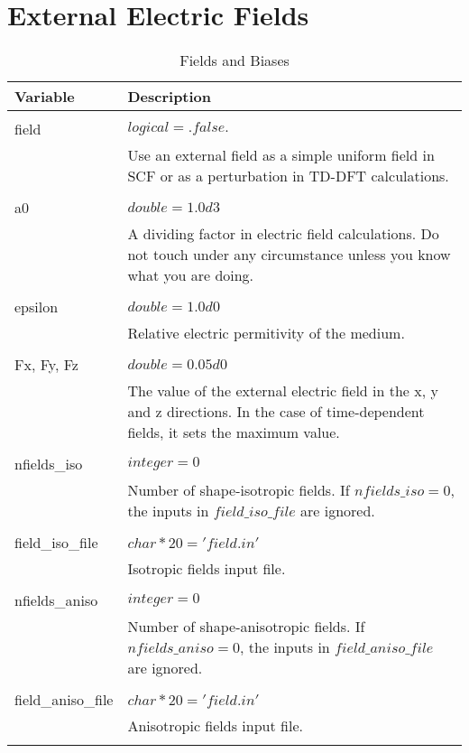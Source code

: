 \section{External Electric Fields}
\begin{Spacing}{1.0}
   \begin{longtable}{ p{} p{} }
   
      \toprule
      \textbf{Variable} & Description \\*
      \midrule \\*
      \endhead
   
      \bottomrule
      \caption{Fields and Biases}
      \endfoot
   
      field & $ logical = .false.$ \\
      & Use an external field as a simple uniform field in SCF or as a 
      perturbation in TD-DFT calculations.\\
      \\
   
      a0 & $ double = 1.0d3 $ \\
      & A dividing factor in electric field calculations. Do not touch
      under any circumstance unless you know what you are doing.\\
      \\
   
      epsilon & $ double = 1.0d0 $ \\
      & Relative electric permitivity of the medium.\\
      \\
   
      Fx, Fy, Fz & $ double = 0.05d0 $ \\
      & The value of the external electric field in the
      x, y and z directions. In the case of time-dependent
      fields, it sets the maximum value. \\
      \\
   
      nfields\_iso & $ integer = 0 $ \\
      & Number of shape-isotropic fields. If $nfields\_iso = 0$,
      the inputs in $field\_iso\_file$ are ignored.\\
      \\
   
      field\_iso\_file & $ char*20 = 'field.in' $ \\
      & Isotropic fields input file.\\
      \\
   
      nfields\_aniso & $ integer = 0 $ \\
      & Number of shape-anisotropic fields. If $nfields\_aniso = 0$, 
      the inputs in $field\_aniso\_file$ are ignored.\\
      \\
   
      field\_aniso\_file & $ char*20 = 'field.in' $ \\
      & Anisotropic fields input file.\\
      \\
   \end{longtable}
\end{Spacing}
   

